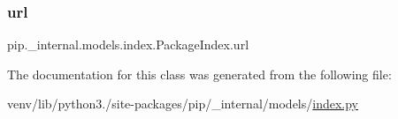 \mbox{\label{classpip_1_1__internal_1_1models_1_1index_1_1PackageIndex_a3c533756a88867b52132951a138a2606}} 
\subsubsection{\texorpdfstring{url}{url}}
{\footnotesize\ttfamily pip.\+\_\+internal.\+models.\+index.\+Package\+Index.\+url}



The documentation for this class was generated from the following file\+:\begin{DoxyCompactItemize}
\item 
venv/lib/python3./site-\/packages/pip/\+\_\+internal/models/\hyperlink{__internal_2models_2index_8py}{index.\+py}\end{DoxyCompactItemize}
